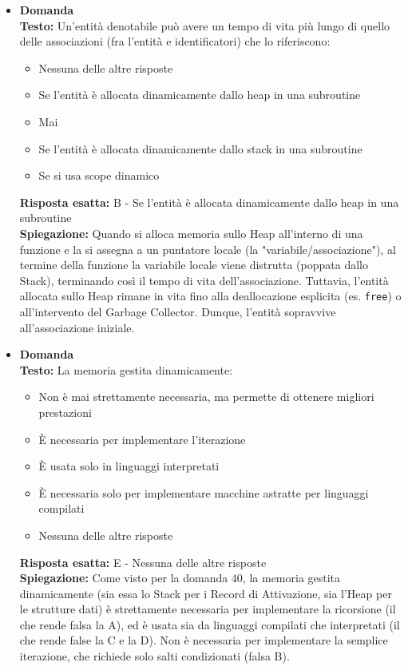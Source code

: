 \documentclass[12pt, a4paper]{article}
\newcounter{domandateoria}
\begin{document}
\begin{itemize}
    \item {}\textbf{Domanda \thedomandateoria} \\
    \textbf{Testo:} Un'entità denotabile può avere un tempo di vita più lungo di quello delle associazioni (fra l'entità e identificatori) che lo riferiscono:
    \begin{itemize}
        \item[A)] Nessuna delle altre risposte
        \item[B)] Se l'entità è allocata dinamicamente dallo heap in una subroutine
        \item[C)] Mai
        \item[D)] Se l'entità è allocata dinamicamente dallo stack in una subroutine
        \item[E)] Se si usa scope dinamico
    \end{itemize}
    \textbf{Risposta esatta:} B - Se l'entità è allocata dinamicamente dallo heap in una subroutine \\
    \textbf{Spiegazione:} Quando si alloca memoria sullo Heap all'interno di una funzione e la si assegna a un puntatore locale (la "variabile/associazione"), al termine della funzione la variabile locale viene distrutta (poppata dallo Stack), terminando così il tempo di vita dell'associazione. Tuttavia, l'entità allocata sullo Heap rimane in vita fino alla deallocazione esplicita (es. \texttt{free}) o all'intervento del Garbage Collector. Dunque, l'entità sopravvive all'associazione iniziale.
    \vspace{0.3cm}

    \item {}\textbf{Domanda \thedomandateoria} \\
    \textbf{Testo:} La memoria gestita dinamicamente:
    \begin{itemize}
        \item[A)] Non è mai strettamente necessaria, ma permette di ottenere migliori prestazioni
        \item[B)] È necessaria per implementare l'iterazione
        \item[C)] È usata solo in linguaggi interpretati
        \item[D)] È necessaria solo per implementare macchine astratte per linguaggi compilati
        \item[E)] Nessuna delle altre risposte
    \end{itemize}
    \textbf{Risposta esatta:} E - Nessuna delle altre risposte \\
    \textbf{Spiegazione:} Come visto per la domanda 40, la memoria gestita dinamicamente (sia essa lo Stack per i Record di Attivazione, sia l'Heap per le strutture dati) è strettamente necessaria per implementare la ricorsione (il che rende falsa la A), ed è usata sia da linguaggi compilati che interpretati (il che rende false la C e la D). Non è necessaria per implementare la semplice iterazione, che richiede solo salti condizionati (falsa B).
    \vspace{0.3cm}


\end{itemize}
\end{document}
